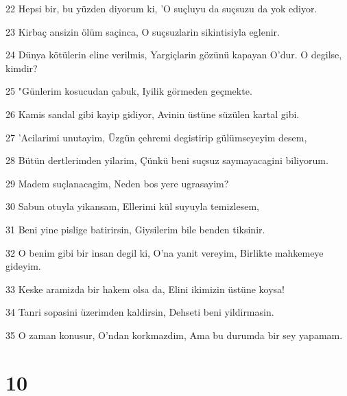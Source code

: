 \par 22 Hepsi bir, bu yüzden diyorum ki, 'O suçluyu da suçsuzu da yok ediyor.
\par 23 Kirbaç ansizin ölüm saçinca, O suçsuzlarin sikintisiyla eglenir.
\par 24 Dünya kötülerin eline verilmis, Yargiçlarin gözünü kapayan O'dur. O degilse, kimdir?
\par 25 "Günlerim kosucudan çabuk, Iyilik görmeden geçmekte.
\par 26 Kamis sandal gibi kayip gidiyor, Avinin üstüne süzülen kartal gibi.
\par 27 'Acilarimi unutayim, Üzgün çehremi degistirip gülümseyeyim desem,
\par 28 Bütün dertlerimden yilarim, Çünkü beni suçsuz saymayacagini biliyorum.
\par 29 Madem suçlanacagim, Neden bos yere ugrasayim?
\par 30 Sabun otuyla yikansam, Ellerimi kül suyuyla temizlesem,
\par 31 Beni yine pislige batirirsin, Giysilerim bile benden tiksinir.
\par 32 O benim gibi bir insan degil ki, O'na yanit vereyim, Birlikte mahkemeye gideyim.
\par 33 Keske aramizda bir hakem olsa da, Elini ikimizin üstüne koysa!
\par 34 Tanri sopasini üzerimden kaldirsin, Dehseti beni yildirmasin.
\par 35 O zaman konusur, O'ndan korkmazdim, Ama bu durumda bir sey yapamam.

\chapter{10}

